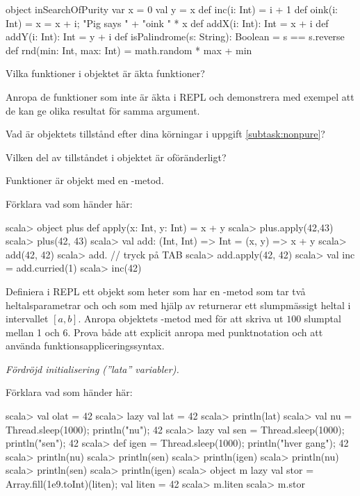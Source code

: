 \begin{Code}
object inSearchOfPurity {
  var x = 0
  val y = x
  def inc(i: Int) = i + 1
  def oink(i: Int) = {x = x + i; "Pig says " + "oink " * x}
  def addX(i: Int): Int = x + i
  def addY(i: Int): Int = y + i
  def isPalindrome(s: String): Boolean = s == s.reverse
  def rnd(min: Int, max: Int) = math.random * max + min
}
\end{Code}

\Subtask\Pen Vilka funktioner i objektet  är äkta funktioner?

\Subtask \label{subtask:nonpure} Anropa de funktioner som inte är äkta i REPL och demonstrera med exempel att de kan ge olika resultat för samma argument.

\Subtask Vad är objektets tillstånd efter dina körningar i uppgift \ref{subtask:nonpure}?

\Subtask Vilken del av tillståndet i objektet är oföränderligt?



\Task Funktioner är objekt med en -metod.

\Subtask Förklara vad som händer här:
\begin{REPL}
scala> object plus { def apply(x: Int, y: Int) = x + y }
scala> plus.apply(42,43)
scala> plus(42, 43)
scala> val add: (Int, Int) => Int = (x, y) => x + y
scala> add(42, 42)
scala> add.   // tryck på TAB
scala> add.apply(42, 42)
scala> val inc = add.curried(1)
scala> inc(42)
\end{REPL}

\Subtask Definiera i REPL ett objekt som heter  som har en -metod som tar två heltalsparametrar  och  och som med hjälp av  returnerar ett slumpmässigt heltal i intervallet $[a, b]$. Anropa objektets -metod med  för att skriva ut $100$ slumptal mellan 1 och 6. Prova både att explicit anropa  med punktnotation och att använda funktionsappliceringssyntax.



\Task \emph{Fördröjd initialisering (''lata'' variabler).}

\Subtask \label{subtask:delayalloc} Förklara vad som händer här:
\begin{REPL}
scala> val olat = 42
scala> lazy val lat = 42
scala> println(lat)
scala> val nu = {Thread.sleep(1000); println("nu"); 42}
scala> lazy val sen = {Thread.sleep(1000); println("sen"); 42}
scala> def igen = {Thread.sleep(1000); println("hver gang"); 42}
scala> println(nu)
scala> println(sen)
scala> println(igen)
scala> println(nu)
scala> println(sen)
scala> println(igen)
scala> object m {lazy val stor = Array.fill(1e9.toInt)(liten); val liten = 42}
scala> m.liten
scala> m.stor
\end{REPL}

